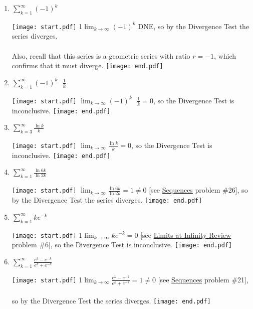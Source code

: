 \documentclass[12pt]{article}
\begin{document}
\begin{enumerate}

\item $\sum_{k=1}^{\infty}(-1)^k$

\texttt{[image: start.pdf]}
{{{1\linewidth}{$\lim_{k \rightarrow \infty}(-1)^k$ DNE, so by the Divergence Test the series diverges. \\ \\  Also, recall that this series is a geometric series with ratio $r=-1$, which  \\ confirms that it must diverge. }}}
\texttt{[image: end.pdf]}


\item $\sum_{k=1}^{\infty}(-1)^k \text{ } \frac{1}{k}$

\texttt{[image: start.pdf]}
{{$\lim_{k \rightarrow \infty}(-1)^k \text{ } \frac{1}{k}=0$, so the Divergence Test is inconclusive. }}
\texttt{[image: end.pdf]}


\item $\sum_{k=3}^{\infty}\frac{\ln{k}}{k}$

\texttt{[image: start.pdf]}
{{$\lim_{k \rightarrow \infty}\frac{\ln{k}}{k}=0$, so the Divergence Test is inconclusive. }}
\texttt{[image: end.pdf]}


\item $\sum_{k=1}^{\infty}\frac{\ln{6k}}{\ln{2k}}$

\texttt{[image: start.pdf]}
{{$\lim_{k \rightarrow \infty}\frac{\ln{6k}}{\ln{2k}}=1\neq0$ [see \underline{Sequences} problem \#26], so by the Divergence Test the series diverges.}}
\texttt{[image: end.pdf]}


\item $\sum_{k=1}^{\infty}{ke^{-k}}$

\texttt{[image: start.pdf]}
{{{1\linewidth}{$\lim_{k \rightarrow \infty}{ke^{-k}}=0$ [see \underline{Limits at Infinity Review} problem \#6], so the Divergence Test is inconclusive.}}}
\texttt{[image: end.pdf]}


\item $\sum_{k=1}^{\infty}\frac{e^k-e^{-k}}{e^k+e^{-k}}$

\texttt{[image: start.pdf]}
{{{1\linewidth}{$\lim_{k \rightarrow \infty}\frac{e^k-e^{-k}}{e^k+e^{-k}}=1\neq0$ [see \underline{Sequences} problem \#21], \\ \\ so by the Divergence Test the series diverges.}}}
\texttt{[image: end.pdf]}



\end{enumerate}
\end{document}
